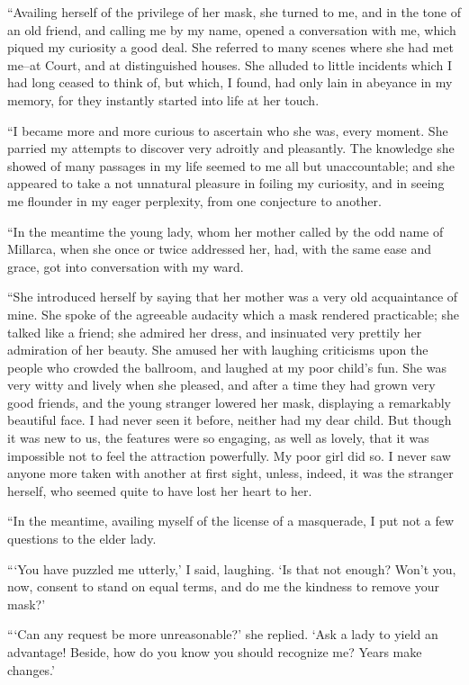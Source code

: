\documentclass[11pt,twoside,makeidx,hidelinks,]{memoir}
\begin{document}
``Availing herself of the privilege of her mask, she turned to me, and in
the tone of an old friend, and calling me by my name, opened a
conversation with me, which piqued my curiosity a good deal. She
referred to many scenes where she had met me--at Court, and at
distinguished houses. She alluded to little incidents which I had long
ceased to think of, but which, I found, had only lain in abeyance in my
memory, for they instantly started into life at her touch.

``I became more and more curious to ascertain who she was, every moment.
She parried my attempts to discover very adroitly and pleasantly. The
knowledge she showed of many passages in my life seemed to me all but
unaccountable; and she appeared to take a not unnatural pleasure in
foiling my curiosity, and in seeing me flounder in my eager perplexity,
from one conjecture to another.

``In the meantime the young lady, whom her mother called by the odd name
of Millarca, when she once or twice addressed her, had, with the same
ease and grace, got into conversation with my ward.

``She introduced herself by saying that her mother was a very old
acquaintance of mine. She spoke of the agreeable audacity which a mask
rendered practicable; she talked like a friend; she admired her dress,
and insinuated very prettily her admiration of her beauty. She amused
her with laughing criticisms upon the people who crowded the ballroom,
and laughed at my poor child's fun. She was very witty and lively when
she pleased, and after a time they had grown very good friends, and the
young stranger lowered her mask, displaying a remarkably beautiful face.
I had never seen it before, neither had my dear child. But though it was
new to us, the features were so engaging, as well as lovely, that it
was impossible not to feel the attraction powerfully. My poor girl did
so. I never saw anyone more taken with another at first sight, unless,
indeed, it was the stranger herself, who seemed quite to have lost her
heart to her.

``In the meantime, availing myself of the license of a masquerade, I put
not a few questions to the elder lady.

``{}`You have puzzled me utterly,' I said, laughing. `Is that not enough?
Won't you, now, consent to stand on equal terms, and do me the kindness
to remove your mask?'

``{}`Can any request be more unreasonable?' she replied. `Ask a lady to
yield an advantage! Beside, how do you know you should recognize me?
Years make changes.'
\end{document}
